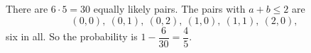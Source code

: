 There are $6\cdot5=30$ equally likely pairs. The pairs with $a+b\le2$ are
\[(0,0),\ (0,1),\ (0,2),\ (1,0),\ (1,1),\ (2,0),\]
six in all. So the probability is $1-\dfrac{6}{30}=\boxed{\dfrac45}$.
